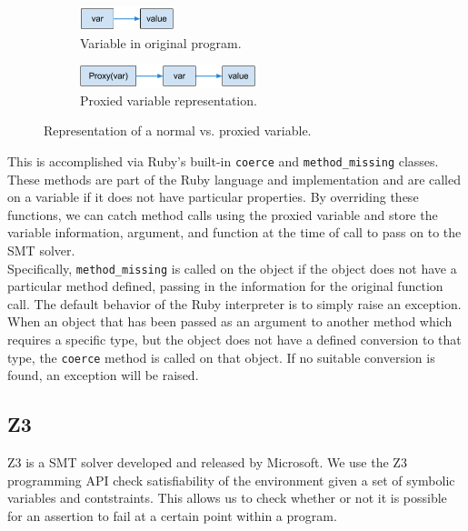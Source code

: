 \documentclass[10pt]{article}
\begin{document}
\begin{figure}
  \centering
  \begin{subfigure}{0.5\textwidth}
	\centering
	\includegraphics[height=25px]{pointer1.png}
	\caption{Variable in original program.}
	\label{pointer:1}
  \end{subfigure}\begin{subfigure}{0.5\textwidth}
	\centering
	\includegraphics[height=25px]{pointer2.png}
	\caption{Proxied variable representation.}
	\label{pointer:2}
  \end{subfigure}
  \caption{Representation of a normal vs. proxied variable.}
\end{figure}

This is accomplished via Ruby's built-in \texttt{coerce} and \texttt{method\_missing} classes.  These methods are part of the Ruby language and implementation and are called on a variable if it does not have particular properties.  By overriding these functions, we can catch method calls using the proxied variable and store the variable information, argument, and function at the time of call to pass on to the SMT solver.\\

Specifically, \texttt{method\_missing} is called on the object if the object does not have a particular method defined, passing in the information for the original function call.  The default behavior of the Ruby interpreter is to simply raise an exception.\\

When an object that has been passed as an argument to another method which requires a specific type, but the object does not have a defined conversion to that type, the \texttt{coerce} method is called on that object.  If no suitable conversion is found, an exception will be raised.\\

\subsection{Z3}
Z3 is a SMT solver developed and released by Microsoft.  We use the Z3 programming API check satisfiability of the environment given a set of symbolic variables and contstraints.  This allows us to check whether or not it is possible for an assertion to fail at a certain point within a program.\\
\end{document}
